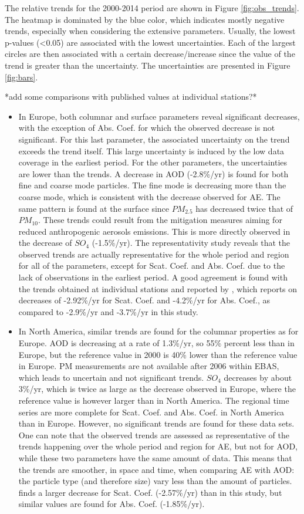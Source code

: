 \documentclass[journal abbreviation, manuscript]{copernicus}
\begin{document}
The relative trends for the 2000-2014 period are shown in Figure \ref{fig:obs_trends}. The heatmap is dominated by the blue color, which indicates mostly negative trends, especially when considering the extensive parameters. Usually, the lowest p-values (<0.05) are associated with the lowest uncertainties. Each of the largest circles are then associated with a certain decrease/increase since the value of the trend is greater than the uncertainty. The uncertainties are presented in Figure \ref{fig:bars}.

*add some comparisons with published values at individual stations?*
\begin{itemize}
 \item In Europe, both columnar and surface parameters reveal significant decreases, with the exception of Abs. Coef. for which the observed decrease is not significant. For this last parameter, the associated uncertainty on the trend exceeds the trend itself. This large uncertainty is induced by the low data coverage in the earliest period. For the other parameters, the uncertainties are lower than the trends. A decrease in AOD (-2.8\%/yr) is found for both fine and coarse mode particles. The fine mode is decreasing more than the coarse mode, which is consistent with the decrease observed for AE. The same pattern is found at the surface since $PM_{2.5}$ has decreased twice that of $PM_{10}$. These trends could result from the mitigation measures aiming for reduced anthropogenic aerosols emissions. This is more directly observed in the decrease of $SO_{4}$ (-1.5\%/yr). The representativity study reveals that the observed trends are actually representative for the whole period and region for all of the parameters, except for Scat. Coef. and Abs. Coef. due to the lack of observations in the earliest period. A good agreement is found with the trends obtained at individual stations and reported by \cite{collaudcoenprep}, which reports on decreases of -2.92\%/yr for Scat. Coef. and -4.2\%/yr for Abs. Coef., as compared to -2.9\%/yr and -3.7\%/yr in this study.
 \item In North America, similar trends are found for the columnar properties as for Europe. AOD is decreasing at a rate of 1.3\%/yr, so 55\% percent less than in Europe, but the reference value in 2000 is 40\% lower than the reference value in Europe. PM measurements are not available after 2006 within EBAS, which leads to uncertain and not significant trends. $SO_{4}$ decreases by about 3\%/yr, which is twice as large as the decrease observed in Europe, where the reference value is however larger than in North America. The regional time series are more complete for Scat. Coef. and Abs. Coef. in North America than in Europe. However, no significant trends are found for these data sets. One can note that the observed trends are assessed as representative of the trends happening over the whole period and region for AE, but not for AOD, while these two parameters have the same amount of data. This means that the trends are smoother, in space and time, when comparing AE with AOD: the particle type (and therefore size) vary less than the amount of particles. \cite{collaudcoenprep} finds a larger decrease for Scat. Coef. (-2.57\%/yr) than in this study, but similar values are found for Abs. Coef. (-1.85\%/yr). 

\end{itemize}
\end{document}
